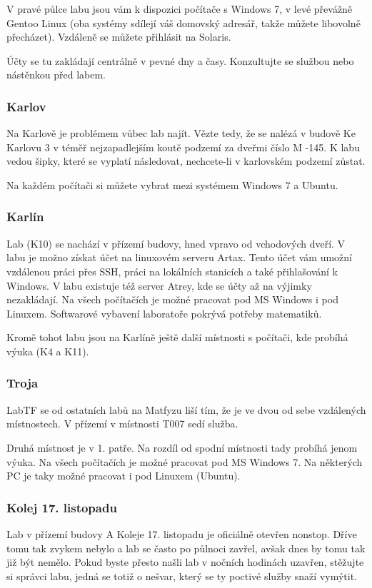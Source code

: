V pravé půlce labu jsou vám k dispozici počítače s Windows 7, v levé převážně
Gentoo Linux (oba systémy sdílejí váš domovský adresář, takže můžete libovolně
přecházet). Vzdáleně se můžete přihlásit na Solaris. 

Účty se tu zakládají centrálně v pevné dny a časy. Konzultujte se službou nebo
nástěnkou před labem.

\subsubsection{Karlov}
Na Karlově je problémem vůbec lab najít. Vězte tedy, že se nalézá v budově Ke
Karlovu 3 v téměř nejzapadlejším koutě podzemí za dveřmi číslo M -145. K labu vedou
šipky, které se vyplatí následovat, nechcete-li v karlovském podzemí zůstat.

Na každém počítači si můžete vybrat mezi systémem Windows 7 a Ubuntu.


\subsubsection{Karlín}
Lab (K10) se nachází v přízemí budovy, hned vpravo od vchodových dveří. V labu
je možno získat účet na linuxovém serveru Artax. Tento účet vám umožní vzdálenou
práci přes SSH, práci na lokálních stanicích a také přihlašování k Windows. V
labu existuje též server Atrey, kde se účty až na výjimky nezakládají. Na všech
počítačích je možné pracovat pod MS Windows i pod Linuxem. Softwarové vybavení
laboratoře pokrývá potřeby matematiků.

Kromě tohot labu jsou na Karlíně ještě další místnosti s počítači, kde probíhá výuka (K4 a K11).


\subsubsection{Troja}
LabTF se od ostatních labů na Matfyzu liší tím, že je ve dvou od sebe vzdálených
místnostech. V přízemí v místnosti T007 sedí služba.

Druhá místnost je v 1. patře. Na rozdíl od spodní místnosti tady probíhá jenom
výuka. Na všech počítačích je možné pracovat pod MS Windows 7. Na některých PC
je taky možné pracovat i pod Linuxem (Ubuntu). 

\subsubsection{Kolej 17. listopadu}
Lab v přízemí budovy A Koleje 17. listopadu je oficiálně otevřen nonstop. Dříve
tomu tak zvykem nebylo a lab se často po půlnoci zavřel, avšak dnes by tomu tak
již být nemělo. Pokud byste přesto našli lab v nočních hodinách uzavřen,
stěžujte si správci labu, jedná se totiž o nešvar, který se ty poctivé služby
snaží vymýtit.

